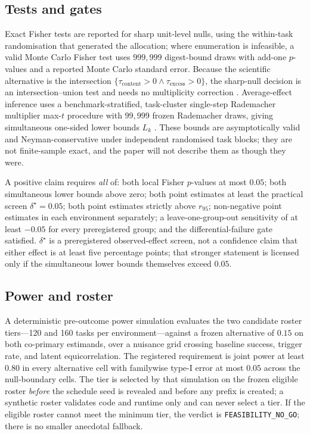 \documentclass{article}
\begin{document}
\subsection{Tests and gates}

Exact Fisher tests are reported for sharp unit-level nulls, using the
within-task randomisation that generated the allocation; where enumeration is
infeasible, a valid Monte Carlo Fisher test uses $999{,}999$ digest-bound draws
with add-one $p$-values and a reported Monte Carlo standard error. Because the
scientific alternative is the intersection
$\{\tau_{\text{content}} > 0 \wedge \tau_{\text{excess}} > 0\}$, the sharp-null
decision is an intersection--union test and needs no multiplicity correction
\cite{berger_intersectionunion_1982}. Average-effect inference uses a
benchmark-stratified, task-cluster single-step Rademacher multiplier max-$t$ procedure
with $99{,}999$ frozen Rademacher draws, giving simultaneous one-sided lower
bounds $L_k$ \cite{romano_wolf_stepdown_2005,chernozhukov_multiplier_2013}.
These bounds are asymptotically valid and Neyman-conservative
under independent randomised task blocks; they are not finite-sample exact, and
the paper will not describe them as though they were.

A positive claim requires \emph{all} of: both local Fisher $p$-values at most
$0.05$; both simultaneous lower bounds above zero; both point estimates at least
the practical screen $\delta^\star = 0.05$; both point estimates strictly above
$r_{95}$; non-negative point estimates in each environment separately; a
leave-one-group-out sensitivity of at least $-0.05$ for every preregistered
group; and the differential-failure gate satisfied. $\delta^\star$ is a
preregistered observed-effect screen, not a confidence claim that either effect
is at least five percentage points; that stronger statement is licensed only if
the simultaneous lower bounds themselves exceed $0.05$.

\subsection{Power and roster}

A deterministic pre-outcome power simulation evaluates the two candidate roster
tiers---120 and 160 tasks per environment---against a frozen alternative of
$0.15$ on both co-primary estimands, over a nuisance grid crossing baseline
success, trigger rate, and latent equicorrelation. The registered requirement is
joint power at least $0.80$ in every alternative cell with familywise type-I
error at most $0.05$ across the null-boundary cells. The tier is selected by
that simulation on the frozen eligible roster \emph{before} the schedule seed is
revealed and before any prefix is created; a synthetic roster validates code and
runtime only and can never select a tier. If the eligible roster cannot meet the
minimum tier, the verdict is \texttt{FEASIBILITY\_NO\_GO}; there is no smaller
anecdotal fallback.
\end{document}
